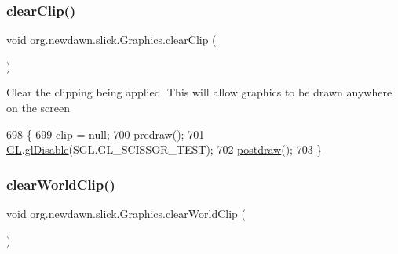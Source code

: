 \subsubsection{\texorpdfstring{clear\+Clip()}{clearClip()}}
{\footnotesize\ttfamily void org.\+newdawn.\+slick.\+Graphics.\+clear\+Clip (\begin{DoxyParamCaption}{ }\end{DoxyParamCaption})\hspace{0.3cm}{\ttfamily [inline]}}

Clear the clipping being applied. This will allow graphics to be drawn anywhere on the screen 
\begin{DoxyCode}
698                             \{
699         \mbox{\hyperlink{classorg_1_1newdawn_1_1slick_1_1_graphics_ad6d9618b35d844e23f1a27b45491020a}{clip}} = null;
700         \mbox{\hyperlink{classorg_1_1newdawn_1_1slick_1_1_graphics_a7b4c203181e3b6302d51ed9b24596b8d}{predraw}}();
701         \mbox{\hyperlink{classorg_1_1newdawn_1_1slick_1_1_graphics_a39ca68db81b225982a4421c4a6835eed}{GL}}.\mbox{\hyperlink{interfaceorg_1_1newdawn_1_1slick_1_1opengl_1_1renderer_1_1_s_g_l_a3b47b402f84bc1404e6b218264981bb5}{glDisable}}(SGL.GL\_SCISSOR\_TEST);
702         \mbox{\hyperlink{classorg_1_1newdawn_1_1slick_1_1_graphics_abe054371d1486618ff327bbbcf02ff97}{postdraw}}();
703     \}
\end{DoxyCode}
\mbox{\label{classorg_1_1newdawn_1_1slick_1_1_graphics_af41755aa81efa87811b38a8817c3e1d0}} 
\subsubsection{\texorpdfstring{clear\+World\+Clip()}{clearWorldClip()}}
{\footnotesize\ttfamily void org.\+newdawn.\+slick.\+Graphics.\+clear\+World\+Clip (\begin{DoxyParamCaption}{ }\end{DoxyParamCaption})\hspace{0.3cm}{\ttfamily [inline]}}

